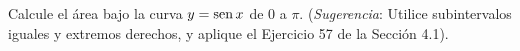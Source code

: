 \item Calcule el área bajo la curva $y = \operatorname{sen} x$ de $0$ a $\pi$. (\textit{Sugerencia}: Utilice subintervalos iguales y extremos derechos, y aplique el Ejercicio 57 de la Sección 4.1).
